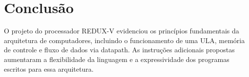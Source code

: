 \documentclass[12pt]{article}
\begin{document}
\section{Conclusão}

O projeto do processador REDUX-V evidenciou os princípios fundamentais da arquitetura de computadores, incluindo o funcionamento de uma ULA, memória de controle e fluxo de dados via datapath. As instruções adicionais propostas aumentaram a flexibilidade da linguagem e a expressividade dos programas escritos para essa arquitetura.
\end{document}
